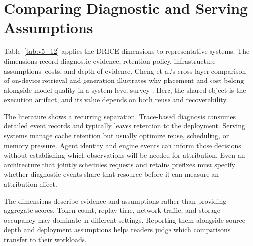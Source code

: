 \documentclass[preprint,12pt]{elsarticle}
\begin{document}
\section{Comparing Diagnostic and Serving Assumptions}
Table~\ref{tab:v5_12} applies the DRICE dimensions to representative systems. The dimensions record diagnostic evidence, retention policy, infrastructure assumptions, costs, and depth of evidence. Cheng et al.'s cross-layer comparison of on-device retrieval and generation illustrates why placement and cost belong alongside model quality in a system-level survey \cite{survey_edge_rag}. Here, the shared object is the execution artifact, and its value depends on both reuse and recoverability.

The literature shows a recurring separation. Trace-based diagnosis consumes detailed event records and typically leaves retention to the deployment. Serving systems manage cache retention but usually optimize reuse, scheduling, or memory pressure. Agent identity and engine events can inform those decisions without establishing which observations will be needed for attribution. Even an architecture that jointly schedules requests and retains prefixes must specify whether diagnostic events share that resource before it can measure an attribution effect.

The dimensions describe evidence and assumptions rather than providing aggregate scores. Token count, replay time, network traffic, and storage occupancy may dominate in different settings. Reporting them alongside source depth and deployment assumptions helps readers judge which comparisons transfer to their workloads.
\end{document}
